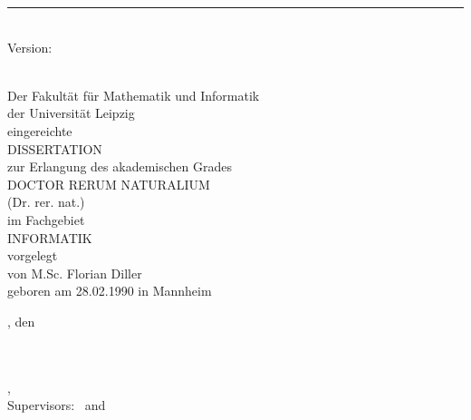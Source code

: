 %
\begin{titlepage}
	\flushright
	\hfill
	\vfill
	{\LARGE\thesisTitle \par}
	\rule[5pt]{\textwidth}{.4pt} \par
	{\Large\thesisName}
	\vfill
	\textit{\large\thesisDate} \\
	Version: \thesisVersion
\end{titlepage}



\begin{titlepage}
	\normalfont
	\centering

	\vfill
	\vspace*{15mm}
	{\tgherosfont \huge \thesisTitle \\[10mm]}
	{\large Der Fakultät für Mathematik und Informatik}\\
	{\large der Universität Leipzig}\\
	{\large eingereichte}\\[10mm]
	{\large DISSERTATION}\\[10mm]
	{\large zur Erlangung des akademischen Grades}\\[7mm]
	{\large DOCTOR RERUM NATURALIUM}\\
	{\large (Dr. rer. nat.)}\\[7mm]
	{\large im Fachgebiet}\\[7mm]
	{\large INFORMATIK}\\[7mm]
	{\large vorgelegt}\\[10mm]
	{\large von M.Sc. Florian Diller}\\
	{\large geboren am 28.02.1990 in Mannheim}\\[20mm]
	\raggedright
	{\large \thesisUniversityCity, den \thesisDate}


\end{titlepage}


\hfill
\vfill
{
	\small
	\textbf{\thesisName} \\
	\textit{\thesisTitle} \\
	\thesisSubject, \thesisDate \\
	Supervisors: \thesisFirstSupervisor\ and \thesisSecondSupervisor \\[1.5em]
	\textbf{\thesisUniversity} \\
	\textit{\thesisUniversityGroup} \\
	\thesisUniversityDepartment \\
	\thesisUniversityStreetAddress \\
	\thesisUniversityPostalCode\ \thesisUniversityCity
}
